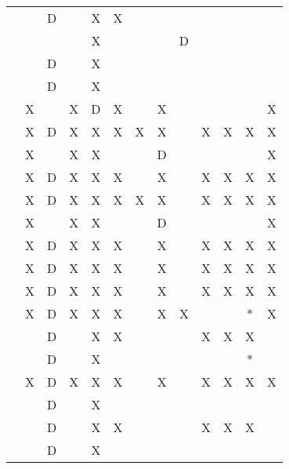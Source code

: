 \begin{table}[pht]
{\begin{tabular}{lccccccccccc}
                  &   & D &   & X & X &   &     &     &     &     &     &    \\  
             &   &   &   & X &   &   &     &  D  &     &     &     &    \\  
                 &   & D &   & X &   &   &     &     &     &     &     &    \\  
                   &   & D &   & X &   &   &     &     &     &     &     &    \\  
                    & X &   & X & D & X &   &  X  &     &     &     &     & X  \\  
                     & X & D & X & X & X & X &  X  &     &  X  &  X  &  X  & X  \\  
                     & X &   & X & X &   &   &  D  &     &     &     &     & X  \\  
               & X & D & X & X & X &   &  X  &     &  X  &  X  &  X  & X  \\  
               & X & D & X & X & X & X &  X  &     &  X  &  X  &  X  & X  \\  
                  & X &   & X & X &   &   &  D  &     &     &     &     & X  \\  
                   & X & D & X & X & X &   &  X  &     &  X  &  X  &  X  & X  \\  
                & X & D & X & X & X &   &  X  &     &  X  &  X  &  X  & X  \\  
                    & X & D & X & X & X &   &  X  &     &  X  &  X  &  X  & X  \\  
                   & X & D & X & X & X &   &  X  &  X  &     &     &  *  & X  \\  
                    &   & D &   & X & X &   &     &     &  X  &  X  &  X  &    \\  
                     &   & D &   & X &   &   &     &     &     &     &  *  &    \\ 
                   & X & D & X & X & X &   &  X  &     &  X  &  X  &  X  & X  \\  
                    &   & D &   & X &   &   &     &     &     &     &     &    \\  
                 &   & D &   & X & X &   &     &     &  X  &  X  &  X  &    \\  
                &   & D &   & X &   &   &     &     &     &     &     &    \\  

\end{tabular}}
\end{table}
